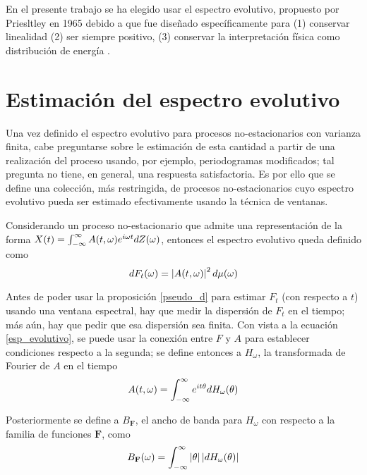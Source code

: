 En el presente trabajo se ha elegido usar el espectro evolutivo, propuesto por Priesltley en
1965 \cite{Priestley65} debido a que fue diseñado específicamente para (1) conservar linealidad 
(2) ser siempre positivo, (3) conservar la interpretación física como distribución de energía
\cite{Loynes68}.


\section{Estimación del espectro evolutivo}

Una vez definido el espectro evolutivo para procesos no-estacionarios con varianza finita, cabe 
preguntarse sobre le estimación de esta cantidad a partir de una realización del proceso usando, 
por ejemplo, periodogramas modificados; tal pregunta no tiene, en general, una respuesta 
satisfactoria.
Es por ello que se define una colección, más restringida, de procesos no-estacionarios cuyo 
espectro evolutivo pueda ser estimado efectivamente usando la técnica de ventanas.

Considerando un proceso no-estacionario \xt que admite una representación de la forma 
$X(t) = \int_{-\infty}^{\infty} A(t,\omega) e^{i \omega t} dZ(\omega)$, entonces el espectro evolutivo queda definido 
como
\begin{equation}
dF_t(\omega) = \left| A(t,\omega) \right|^{2} d\mu(\omega)
\label{esp_evolutivo}
\end{equation}

Antes de poder usar la proposición \ref{pseudo_d} para estimar $F_t$ (con respecto a $t$) usando 
una ventana espectral, hay que medir la dispersión de $F_t$ en el tiempo; más aún, hay que pedir 
que esa dispersión sea finita.
Con vista a la ecuación \ref{esp_evolutivo}, se puede usar la conexión entre $F$ y $A$ para 
establecer condiciones respecto a la segunda; se define entonces a $H_\omega$, la transformada de
Fourier de $A$ en el tiempo
\begin{equation}
A(t,\omega) = \int_{-\infty}^{\infty} e^{i t \theta} dH_\omega(\theta)
\end{equation}

Posteriormente se define a $B_{\mathbf{F}}$, el ancho de banda para $H_\omega$ con respecto a la 
familia de funciones $\mathbf{F}$, como
%
\begin{equation}
B_{\mathbf{F}}(\omega) = \int_{-\infty}^{\infty} \left| \theta \right| \left| dH_\omega(\theta) \right|
\end{equation}

